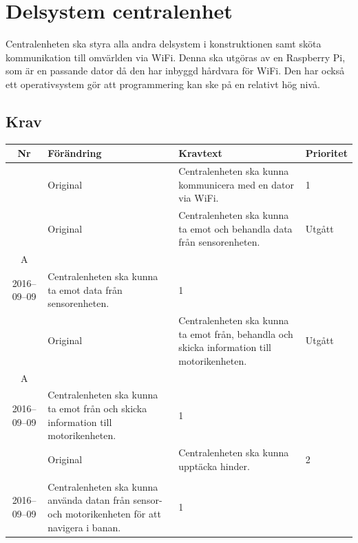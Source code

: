\documentclass[a4paper,titlepage,12pt]{article}
\newcounter{reqNr}
\newcommand{\nextReqNr}{\stepcounter{reqNr}\arabic{reqNr}}
\newcounter{reqNrII}
\newcommand{\nextReqNrII}{\stepcounter{reqNrII}\arabic{reqNrII}}
\newcommand{\newContent}[1] {\pbox{5cm}{Nytt innehåll i \arabic{reqNr}\\#1}}
\newcommand{\newRequirement}[1] {\pbox{5cm}{Tillagt \\#1}}
\begin{document}
	\section{Delsystem centralenhet}
	Centralenheten ska styra alla andra delsystem i konstruktionen samt sköta
	kommunikation till omvärlden via WiFi. Denna ska utgöras av en Raspberry
	Pi, som är en passande dator då den har inbyggd hårdvara för WiFi. Den har 
	också ett operativsystem gör att programmering kan ske på en relativt hög nivå.

	\subsection{Krav}
	\begin{longtable}[c]{ c l>{\raggedright}p{} l }
		\textbf{Nr} & \textbf{Förändring} & \textbf{Kravtext} & \textbf{Prioritet} 
			\\ \midrule

		\nextReqNr{} & Original & Centralenheten ska kunna kommunicera 
			med en dator via WiFi. & 1
			\\ \midrule

		\nextReqNr{} & Original & Centralenheten ska kunna ta emot och 
			behandla data från sensorenheten.& Utgått
			\\ \midrule
		\arabic{reqNr}A & \newContent{2016--09--09} & Centralenheten ska kunna ta emot 
			data från sensorenheten.& 1
			\\ \midrule

		\nextReqNr{} & Original & Centralenheten ska kunna ta emot från, 
			behandla och skicka information till motorikenheten. & Utgått
			\\ \midrule

		\arabic{reqNr}A & \newContent{2016--09--09} & Centralenheten ska kunna ta emot från
			 och skicka information till motorikenheten. & 1
			\\ \midrule

		\nextReqNr{} & Original & Centralenheten ska kunna upptäcka hinder. & 2
		\\ \midrule

		\nextReqNrII{} & \newRequirement{2016--09--09} & Centralenheten ska kunna använda
		datan från sensor- och motorikenheten för att navigera i banan.  & 1
	\end{longtable}
\end{document}

